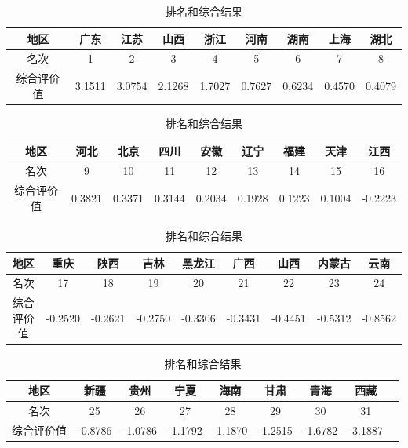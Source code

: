 \begin{table}[htbp]
\footnotesize
  \centering
  \caption{\heiti 排名和综合结果}\label{tab:PaiMIng}
  \begin{tabular}{ccccccccc}
    \toprule
    地区 & 广东 & 江苏 & 山西 & 浙江 & 河南 & 湖南 & 上海 & 湖北 \\
    \midrule
    名次 & 1 & 2 & 3 & 4 & 5 & 6 & 7 & 8 \\
    综合评价值 & \phantom{-}3.1511  &  \phantom{-}3.0754 &   \phantom{-}2.1268 &   \phantom{-}1.7027  &  \phantom{-}0.7627 &   \phantom{-}0.6234 &   \phantom{-}0.4570  &  \phantom{-}0.4079 \\
    \bottomrule
  \end{tabular}
  \begin{tabular}{ccccccccc}
    \toprule
    地区 & 河北 & 北京 & 四川 & 安徽 & 辽宁 & 福建 & 天津 & 江西 \\
    \midrule
    名次 & 9 & 10 & 11 & 12 & 13 & 14 & 15 & 16 \\
    综合评价值 & \phantom{-}0.3821  &  \phantom{-}0.3371 &   \phantom{-}0.3144  &  \phantom{-}0.2034 &   \phantom{-}0.1928  &  \phantom{-}0.1223  &  \phantom{-}0.1004  &  -0.2223  \\
    \bottomrule
  \end{tabular}
  \begin{tabular}{ccccccccc}
    \toprule
    地区 & 重庆 & 陕西 & 吉林 & 黑龙江 & 广西 & 山西 & 内蒙古 & 云南 \\
    \midrule
    名次 & 17 & 18 & 19 & 20 & 21 & 22 & 23 & 24 \\
    综合评价值 & -0.2520  & -0.2621 &  -0.2750  & -0.3306 &  -0.3431 &  -0.4451  & -0.5312 &  -0.8562  \\
    \bottomrule
  \end{tabular}
  \begin{tabular}{ccccccccc}
    \toprule
    地区 & 新疆 & 贵州 & 宁夏 & 海南 & 甘肃 & 青海 & 西藏 &  \\
    \midrule
    名次 & 25 & 26 & 27 & 28 & 29 & 30 & 31 &  \\
    综合评价值 & -0.8786  & -1.0786 &  -1.1792 &  -1.1870 &  -1.2515 &  -1.6782 &  -3.1887 &\phantom{-0.0000}\\
    \bottomrule
  \end{tabular}
\end{table}

